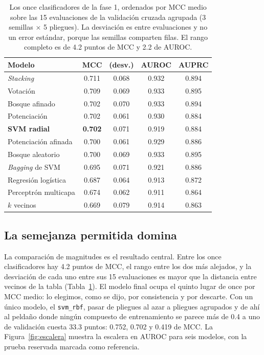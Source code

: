 \documentclass[twocolumn,10pt,letterpaper]{article}
\begin{document}
\begin{table}[tb]
  \centering
  \caption{Los once clasificadores de la fase 1, ordenados por MCC medio sobre las 15 evaluaciones de la validación cruzada agrupada (3 semillas $\times$ 5 pliegues). La desviación es entre evaluaciones y no un error estándar, porque las semillas comparten filas. El rango completo es de 4.2 puntos de MCC y 2.2 de AUROC.}
  \label{tab:modelos}
  \small\setlength{\tabcolsep}{4pt}
  \begin{tabular}{lcccc}
    \toprule
    Modelo & MCC & (desv.) & AUROC & AUPRC \\
    \midrule
    \emph{Stacking}        & 0.711 & 0.068 & 0.932 & 0.894 \\
    Votación               & 0.709 & 0.069 & 0.933 & 0.895 \\
    Bosque afinado         & 0.702 & 0.070 & 0.933 & 0.894 \\
    Potenciación           & 0.702 & 0.061 & 0.930 & 0.884 \\
    \textbf{SVM radial}    & \textbf{0.702} & 0.071 & 0.919 & 0.884 \\
    Potenciación afinada   & 0.700 & 0.061 & 0.929 & 0.886 \\
    Bosque aleatorio       & 0.700 & 0.069 & 0.933 & 0.895 \\
    \emph{Bagging} de SVM  & 0.695 & 0.071 & 0.921 & 0.886 \\
    Regresión logística    & 0.687 & 0.064 & 0.913 & 0.872 \\
    Perceptrón multicapa   & 0.674 & 0.062 & 0.911 & 0.864 \\
    $k$ vecinos            & 0.669 & 0.079 & 0.914 & 0.863 \\
    \bottomrule
  \end{tabular}
\end{table}

\subsection{La semejanza permitida domina}

La comparación de magnitudes es el resultado central. Entre los once clasificadores hay 4.2 puntos de MCC, el rango entre los dos más alejados, y la desviación de cada uno entre sus 15 evaluaciones es mayor que la distancia entre vecinos de la tabla (Tabla~\ref{tab:modelos}). El modelo final ocupa el quinto lugar de once por MCC medio: lo elegimos, como se dijo, por consistencia y por descarte. Con un único modelo, el \texttt{svm\_rbf}, pasar de pliegues al azar a pliegues agrupados y de ahí al peldaño donde ningún compuesto de entrenamiento se parece más de 0.4 a uno de validación cuesta 33.3 puntos: 0.752, 0.702 y 0.419 de MCC. La Figura~\ref{fig:escalera} muestra la escalera en AUROC para seis modelos, con la prueba reservada marcada como referencia.
\end{document}
